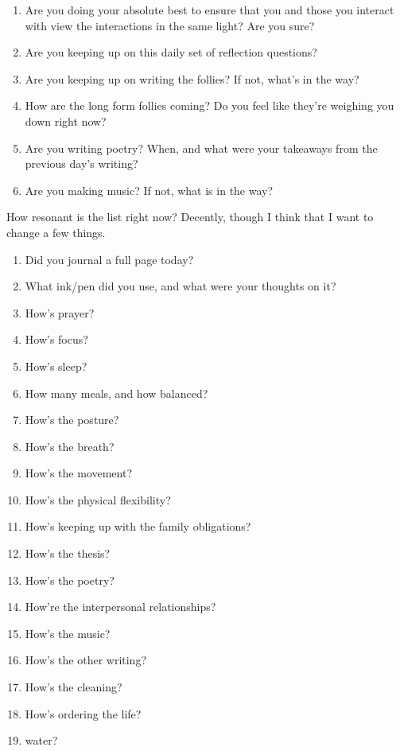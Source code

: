 \documentclass[12pt]{article}
\renewcommand{\,}{\textsuperscript{,}}
\begin{document}
\begin{enumerate}
\item Are you doing your absolute best to ensure that you and those you interact with view the interactions in the same light? Are you sure?

\item Are you keeping up on this daily set of reflection questions?

\item Are you keeping up on writing the follies? If not, what's in the way?

\item How are the long form follies coming? Do you feel like they're weighing you down right now?

\item Are you writing poetry? When, and what were your takeaways from the previous day's writing?

\item Are you making music? If not, what is in the way?

\end{enumerate}

How resonant is the list right now? Decently, though I think that I want to change a few things.

\begin{enumerate}

\item Did you journal a full page today?  
\item What ink/pen did you use, and what were your thoughts on it?  
\item How's prayer?  
\item How's focus?  
\item How's sleep?  
\item How many meals, and how balanced?  
\item How's the posture?  
\item How's the breath?  
\item How's the movement?  
\item How's the physical flexibility?  
\item How's keeping up with the family obligations?  
\item How's the thesis?  
\item How's the poetry?  
\item How're the interpersonal relationships?  
\item How's the music?  
\item How's the other writing?  
\item How's the cleaning?  
\item How's ordering the life?  
\item water?

\end{enumerate}
\end{document}
